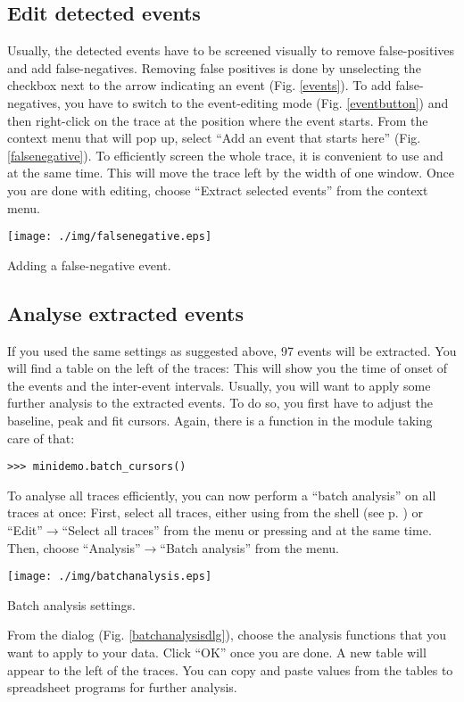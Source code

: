 \subsection{Edit detected events}
Usually, the detected events have to be screened visually to remove false-positives and add false-negatives. Removing false positives is done by unselecting the checkbox next to the arrow indicating an event (Fig. \ref{events}). To add false-negatives, you have to switch to the event-editing mode (Fig. \ref{eventbutton}) and then right-click on the trace at the position where the event starts. From the context menu that will pop up, select ``Add an event that starts here'' (Fig. \ref{falsenegative}). To efficiently screen the whole trace, it is convenient to use  and \keybox{$\leftarrow$} at the same time. This will move the trace left by the width of one window. Once you are done with editing, choose ``Extract selected events'' from the context menu.
  \begin{myfigure}[htb]
    \begin{center}
      \texttt{[image: ./img/falsenegative.eps]}
    \end{center}
    \caption{Adding a false-negative event.}
    \label{falsenegative}
  \end{myfigure}

\subsection{Analyse extracted events}
If you used the same settings as suggested above, 97 events will be extracted. You will find a table on the left of the traces: This will show you the time of onset of the events and the inter-event intervals. Usually, you will want to apply some further analysis to the extracted events. To do so, you first have to adjust the baseline, peak and fit cursors. Again, there is a function in the  module taking care of that:
\begin{lstlisting}
>>> minidemo.batch_cursors()
\end{lstlisting}
To analyse all traces efficiently, you can now perform a ``batch analysis'' on all traces at once: First, select all traces, either using  from the shell (see p. \pageref{selectall}) or ``Edit''$\rightarrow$``Select all traces'' from the menu or pressing  and  at the same time. Then, choose ``Analysis''$\rightarrow$``Batch analysis'' from the menu.
  \begin{myfigure}[htb]
    \begin{center}
      \texttt{[image: ./img/batchanalysis.eps]}
    \end{center}
    \caption{Batch analysis settings.}
    \label{batchanalysisdlg}
  \end{myfigure}
From the dialog (Fig. \ref{batchanalysisdlg}), choose the analysis functions that you want to apply to your data. Click ``OK'' once you are done. A new table will appear to the left of the traces. You can copy and paste values from the tables to spreadsheet programs for further analysis.

